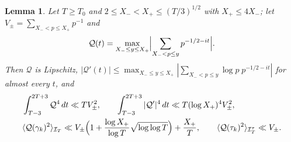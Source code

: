 \documentclass[preprint,12pt]{elsarticle}
\numberwithin{equation}{section}
\theoremstyle{plain}
\newtheorem{lemma}[theorem]{Lemma}
\theoremstyle{definition}
\theoremstyle{remark}
\newcommand{\IT}{\mathcal I_T}
\begin{document}
\begin{lemma}\label{lem:maximal_primes}
Let $T\ge T_0$ and $2\le X_-<X_+\le(T/3)^{1/2}$ with $X_+\le4X_-$; let $V_\pm=\sum_{X_-<p\le X_+}p^{-1}$ and
\[
\mathcal Q(t)=\max_{X_-\le y\le X_+}\Bigl|\sum_{X_-<p\le y}p^{-1/2-it}\Bigr| .
\]
Then $\mathcal Q$ is Lipschitz, $|\mathcal Q'(t)|\le\max_{X_-\le y\le X_+}|\sum_{X_-<p\le y}\log p\;p^{-1/2-it}|$ for almost every $t$, and
\begin{align}
&\int_{T-3}^{2T+3}\mathcal Q^4\,dt\ll TV_\pm^2,\qquad\int_{T-3}^{2T+3}|\mathcal Q'|^4\,dt\ll T(\log X_+)^4V_\pm^2,
\label{eq:maximal_L4}\\
&\langle\mathcal Q(\gamma_k)^2\rangle_{\IT}\ll V_\pm\Bigl(1+\frac{\log X_+}{\log T}\sqrt{\log\log T}\Bigr)+\frac{X_+}T,\qquad\langle\mathcal Q(\tau_k)^2\rangle_{\mathcal I^\tau_T}\ll V_\pm .
\label{eq:maximal_points}
\end{align}
\end{lemma}
\end{document}
